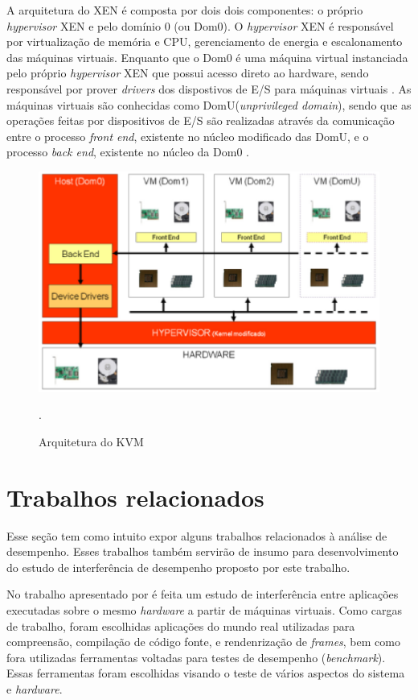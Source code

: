 A arquitetura do XEN é composta por dois dois componentes: o próprio \textit{hypervisor} XEN e pelo domínio 0 (ou Dom0). O \textit{hypervisor} XEN é responsável por virtualização de memória e CPU, gerenciamento de energia e escalonamento das máquinas virtuais. Enquanto que o Dom0 é uma máquina virtual instanciada pelo próprio \textit{hypervisor} XEN que possui acesso direto ao hardware, sendo responsável por prover \textit{drivers} dos dispostivos de E/S para máquinas virtuais \cite{redhatkvm}. As máquinas virtuais são conhecidas como DomU(\textit{unprivileged domain}), sendo que as operações feitas por dispositivos de E/S são realizadas através da comunicação entre o processo \textit{front end}, existente no núcleo modificado das DomU, e o processo \textit{back end}, existente no núcleo da Dom0 \cite{redhatkvm}.

\begin{figure}[!htb]
\centering
\includegraphics [keepaspectratio=true,scale=0.65]{figuras/xen_arquitecture.eps}
\caption{Arquitetura do KVM}
\cite{fabiano}.
\label{xen_arquitecture}
\end{figure}

\section{Trabalhos relacionados}
Esse seção tem como intuito expor alguns trabalhos relacionados à análise de desempenho. Esses trabalhos também servirão de insumo para desenvolvimento do estudo de interferência de desempenho proposto por este trabalho.

No trabalho apresentado por \cite{koh2007} é feita um estudo de interferência entre aplicações executadas sobre o mesmo \textit{hardware} a partir de máquinas virtuais. Como cargas de trabalho, foram escolhidas aplicações do mundo real utilizadas para compreensão, compilação de código fonte, e rendenrização de \textit{frames}, bem como fora utilizadas ferramentas voltadas para testes de desempenho (\textit{benchmark}). Essas ferramentas foram escolhidas visando o teste de vários aspectos do sistema e \textit{hardware}.

